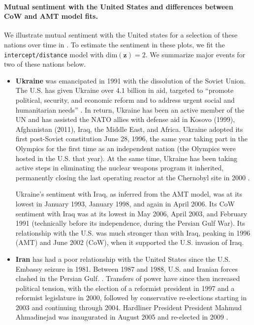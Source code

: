 \paragraph{Mutual sentiment with the United States and differences
 between CoW and AMT model fits.}
We illustrate mutual sentiment with the United states for a selection
of these nations over time in .
To estimate the sentiment in these plots, we fit the
\verb!intercept/distance! model with $\mbox{dim}(\bm z) = 2$.
We summarize major events for two of these nations below.
\begin{itemize}
  \item \textbf{Ukraine} was emancipated in 1991 with the dissolution
    of the Soviet Union.  The U.S. has given Ukraine over $4.1$
    billion in aid, targeted to ``promote political, security, and
    economic reform and to address urgent social and humanitarian
    needs'' \citep{ukrainestate:2012}.  In return, Ukraine has been an
    active member of the UN and has assisted the NATO allies with
    defense aid in Kosovo (1999), Afghanistan (2011), Iraq, the Middle
    East, and Africa.  Ukraine adopted its first post-Soviet
    constitution June 28, 1996, the same year taking part in the
    Olympics for the first time as an independent nation (the Olympics
    were hosted in the U.S. that year).  At the same time, Ukraine has
    been taking active steps in eliminating the nuclear weapons
    program it inherited, permanently closing the last operating
    reactor at the Chernobyl site in 2000 \citep{ukrainestate:2012}.

    Ukraine's sentiment with Iraq, as inferred from the AMT model, was
    at its lowest in January 1993, January 1998, and again in April
    2006.  Its CoW sentiment with Iraq was at its lowest in May 2006,
    April 2003, and February 1991 (technically before its
    independence, during the Persian Gulf War). Its relationship with
    the U.S. was much stronger than with Iraq, peaking in 1996 (AMT)
    and June 2002 (CoW), when it supported the U.S. invasion of Iraq.

  \item \textbf{Iran} has had a poor relationship with the United
    States since the U.S. Embassy seizure in 1981.  Between 1987 and
    1988, U.S. and Iranian forces clashed in the Persian Gulf.
    \citep{irancia:2012}.  Transfers of power have since then increased
    political tension, with the election of a reformist president in
    1997 and a reformist legislature in 2000, followed by conservative
    re-elections starting in 2003 and continuing through 2004.
    Hardliner President President Mahmud Ahmadinejad was inaugurated
    in August 2005 and re-elected in 2009 \citep{irancia:2012}.


\end{itemize}
